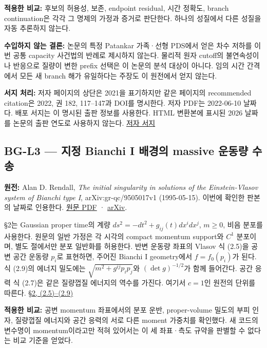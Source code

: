 \documentclass[11pt,a4paper]{article}
\begin{document}
\textbf{적용한 비교:} 후보의 허용성, 보존, endpoint residual, 시간 정확도, branch continuation은 각각 그 명제의 가정과 증거로 판단한다. 하나의 성질에서 다른 성질을 자동 추론하지 않는다.

\textbf{수입하지 않는 결론:} 논문의 특정 Patankar 가족·선형 PDS에서 얻은 차수 저하를 이번 공통 capacity 사건법의 반례로 제시하지 않는다. 물리적 원자 cutoff의 불연속성이나 반응으로 질량이 변한 prefix 선택은 이 논문의 분석 대상이 아니다. 임의 시간 간격에서 모든 새 branch 해가 유일하다는 주장도 이 원전에서 얻지 않는다.

\textbf{서지 처리:} 저자 페이지의 상단은 2021을 표기하지만 같은 페이지의 recommended citation은 2022, 권 182, 117--147과 DOI를 명시한다. 저자 PDF는 2022-06-10 날짜다. 배포 서지는 이 명시된 출판 정보를 사용한다. HTML 변환본에 표시된 2026 날짜를 논문의 출판 연도로 사용하지 않는다. \href{https://davidetorlo.it/publication/2021-08-18-stability-patankar}{저자 서지}

\hypertarget{bg-l3-uxc9c0uxc815-bianchi-i-uxbc30uxacbduxc758-massive-uxc6b4uxb3d9uxb7c9-uxc218uxc1a1}{%
\subsection{BG-L3 --- 지정 Bianchi I 배경의 massive 운동량 수송}\label{bg-l3-uxc9c0uxc815-bianchi-i-uxbc30uxacbduxc758-massive-uxc6b4uxb3d9uxb7c9-uxc218uxc1a1}}

\textbf{원전:} Alan D. Rendall, \emph{The initial singularity in solutions of the Einstein-Vlasov system of Bianchi type I}, arXiv:gr-qc/9505017v1 (1995-05-15). 이번에 확인한 판본의 날짜로 인용한다. \href{https://export.arxiv.org/pdf/gr-qc/9505017v1.pdf}{원문 PDF} · \href{https://arxiv.org/abs/gr-qc/9505017}{arXiv}.

§2는 Gaussian proper time의 계량 \(ds^2=-dt^2+g_{ij}(t)dx^idx^j\), \(m\ge0\), 비음 분포를 사용한다. 원문의 일반 가정은 각 시각의 compact momentum support와 \(C^1\) 분포이며, 별도 절에서만 분포 일반화를 허용한다. 반변 운동량 좌표의 Vlasov 식 (2.5)을 공변 공간 운동량 \(p_i\)로 표현하면, 주어진 Bianchi I geometry에서 \(f=f_0(p_i)\)가 된다. 식 (2.9)의 에너지 밀도에는 \(\sqrt{m^2+g^{ij}p_ip_j}\)와 \((\det g)^{-1/2}\)가 함께 들어간다. 공간 응력 식 (2.7)은 같은 질량껍질 에너지의 역수를 가진다. 여기서 \(c=1\)인 원전의 단위를 따른다. \href{https://export.arxiv.org/pdf/gr-qc/9505017v1.pdf}{§2, (2.5)--(2.9)}

\textbf{적용한 비교:} 공변 momentum 좌표에서의 분포 운반, proper-volume 밀도의 부피 인자, 질량껍질 에너지와 공간 응력의 서로 다른 moment 가중치를 확인했다. 새 코드의 변수명이 momentum이라고만 적혀 있어서는 이 세 좌표·측도 규약을 판별할 수 없다는 비교 기준을 얻었다.
\end{document}

